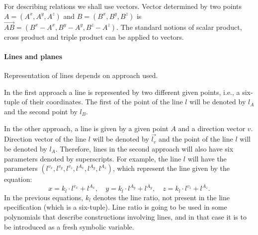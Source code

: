 \documentclass[final,1p,times,authoryear]{elsarticle}
\begin{document}
For describing relations we shall use vectors. Vector determined by
two points $A = (A^x, A^y, A^z)$ and $B = (B^x, B^y, B^z)$ is
$\overrightarrow{AB} = (B^x- A^x, B^y - A^y, B^z - A^z)$. The standard
notions of scalar product, cross product and triple product can be
applied to vectors.


\paragraph{Lines and planes}

Representation of lines depends on approach used.

In the first approach a line is represented by two different given
points, i.e., a six-tuple of their coordinates. The first of the point
of the line $l$ will be denoted by $l_A$ and the second point by
$l_B$.

In the other approach, a line is given by a given point $A$ and a
direction vector $v$. Direction vector of the line $l$ will be denoted
by $\overrightarrow{l_v}$ and the point of the line $l$ will be
denoted by $l_A$. Therefore, lines in the second approach will also
have six parameters denoted by superscripts. For example, the line $l$
will have the parameters $(l^{v_x}, l^{v_y}, l^{v_z}, l^{A_x},
l^{A_y}, l^{A_z})$, which represent the line given by the equation:
$$x = k_l\cdot l^{v_x} + l^{A_x},\quad y = k_l\cdot l^{A_y} +
l^{A_y},\quad z = k_l\cdot l^{v_z} + l^{A_z}.$$ In the previous
equations, $k_l$ denotes the line ratio, not present in the line
specification (which is a six-tuple). Line ratio is going to be used
in some polynomials that describe constructions involving lines, and
in that case it is to be introduced as a fresh symbolic variable.
\end{document}
